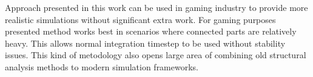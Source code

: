 Approach presented in this work can be used in gaming industry to provide more realistic simulations without significant extra work. For gaming purposes presented method works best in scenarios where connected parts are relatively heavy. This allows normal integration timestep to be used without stability issues. This kind of metodology also opens large area of combining old structural analysis methods to modern simulation frameworks.


